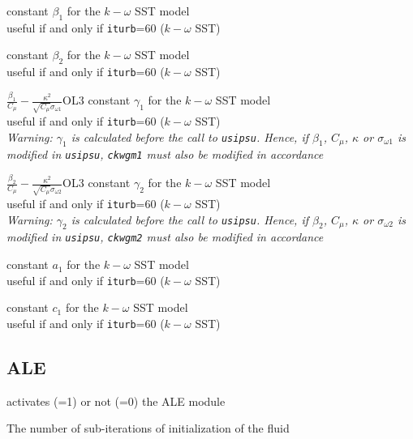 {constant $\beta_1$ for the $k-\omega$ SST model\\
useful if and only if {\tt iturb}=60
($k-\omega$ SST)}

{constant $\beta_2$ for the $k-\omega$ SST model\\
useful if and only if {\tt iturb}=60
($k-\omega$ SST)}

{$\frac{\beta_1}{C_\mu}-\frac{\kappa^2}{\sqrt{C_\mu}\sigma_{\omega 1}}$}{O}{L3}
{constant $\gamma_1$ for the $k-\omega$ SST model\\
useful if and only if {\tt iturb}=60
($k-\omega$ SST)\\
{\em Warning: $\gamma_1$ is calculated before the call to
\texttt{usipsu}. Hence, if $\beta_1$, $C_\mu$, $\kappa$ or $\sigma_{\omega 1}$
is modified in \texttt{usipsu}, \texttt{ckwgm1} must also be modified in accordance}}

{$\frac{\beta_2}{C_\mu}-\frac{\kappa^2}{\sqrt{C_\mu}\sigma_{\omega 2}}$}{O}{L3}
{constant $\gamma_2$ for the $k-\omega$ SST model\\
useful if and only if {\tt iturb}=60
($k-\omega$ SST)\\
{\em Warning: $\gamma_2$ is calculated before the call to
\texttt{usipsu}. Hence, if $\beta_2$, $C_\mu$, $\kappa$ or $\sigma_{\omega 2}$
is modified in \texttt{usipsu}, \texttt{ckwgm2} must also be modified in
accordance}}

{constant $a_1$ for the $k-\omega$ SST model\\
useful if and only if {\tt iturb}=60
($k-\omega$ SST)}

{constant $c_1$ for the $k-\omega$ SST model\\
useful if and only if {\tt iturb}=60
($k-\omega$ SST)}


\subsection{ALE}
{activates (=1) or not (=0)  the ALE module}

{The number of sub-iterations of initialization of the fluid}

